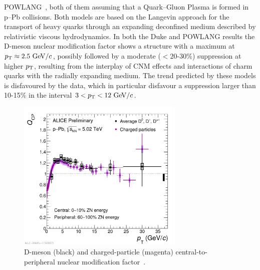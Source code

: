 POWLANG~\cite{Beraudo:2015wsd}, both of them assuming that a 
Quark--Gluon Plasma is formed in p--Pb collisions.
Both models are based on the Langevin approach for the transport of heavy 
quarks through an expanding deconfined medium described by relativistic viscous 
hydrodynamics. In both the Duke and POWLANG results the D-meson nuclear modification
factor shows  a structure with a 
maximum at $p_{\rm T} \approx 2.5~\mathrm{GeV}/c$, possibly followed by a moderate 
($<20$-30\%) suppression at higher $p_{\rm T}$,
resulting from the interplay of CNM effects and interactions of charm quarks with the
radially expanding medium.
The trend predicted by these models is disfavoured by the data, which in particular 
disfavour a suppression 
larger than 10-15\% in the interval $3<p_{\rm T}<12~\mathrm{GeV}/c$.\\
\begin{figure}[!ht]
  \centering
    \includegraphics[width=8cm]{FigCap2/2017-Sep-12-QCP-Daverage-ChargedHadrons.pdf}
  \caption{D-meson (black) and charged-particle (magenta) central-to-peripheral nuclear modification factor~\cite{ALICEPAS2017008}.}
  \label{fig:RpA}
\end{figure}




